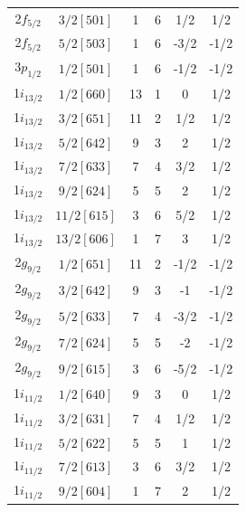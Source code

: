 \documentclass[8pt,a4paper, twoside]{report}
\begin{document}
\begin{table}[htbp]
\begin{tabular}{|c|c|c|c|c|c|}
2$f_{5/2}$ & $3/2[501]$             & 1          & 6             & 1/2       & 1/2        \\
2$f_{5/2}$ & $5/2[503]$             & 1          & 6             & -3/2       & -1/2        \\
3$p_{1/2}$ & $1/2[501]$             & 1          & 6             & -1/2       & -1/2        \\
\midrule
1$i_{13/2}$ & $1/2[660]$            & 13         & 1             & 0        & 1/2       \\
1$i_{13/2}$ & $3/2[651]$            & 11         & 2             & 1/2        & 1/2       \\
1$i_{13/2}$ & $5/2[642]$            & 9          & 3             & 2        & 1/2       \\
1$i_{13/2}$ & $7/2[633]$            & 7          & 4             & 3/2      & 1/2         \\
1$i_{13/2}$ & $9/2[624]$            & 5          & 5             & 2        & 1/2       \\
1$i_{13/2}$ & $11/2[615]$           & 3          & 6             & 5/2      & 1/2         \\
1$i_{13/2}$ & $13/2[606]$           & 1          & 7             & 3         & 1/2      \\
2$g_{9/2}$  & $1/2[651]$            & 11         & 2             & -1/2        & -1/2       \\
2$g_{9/2}$  & $3/2[642]$            & 9          & 3             & -1          & -1/2     \\
2$g_{9/2}$  & $5/2[633]$            & 7          & 4             & -3/2       & -1/2        \\
2$g_{9/2}$  & $7/2[624]$            & 5          & 5             & -2        & -1/2       \\
2$g_{9/2}$  & $9/2[615]$            & 3          & 6             & -5/2      & -1/2         \\
1$i_{11/2}$ & $1/2[640]$            & 9          & 3             & 0         & 1/2      \\
1$i_{11/2}$ & $3/2[631]$            & 7          & 4             & 1/2      & 1/2         \\
1$i_{11/2}$ & $5/2[622]$            & 5          & 5             & 1       & 1/2        \\
1$i_{11/2}$ & $7/2[613]$            & 3          & 6             & 3/2      & 1/2         \\
1$i_{11/2}$ & $9/2[604]$            & 1          & 7             & 2       & 1/2        \\

\end{tabular}
\end{table}
\end{document}
